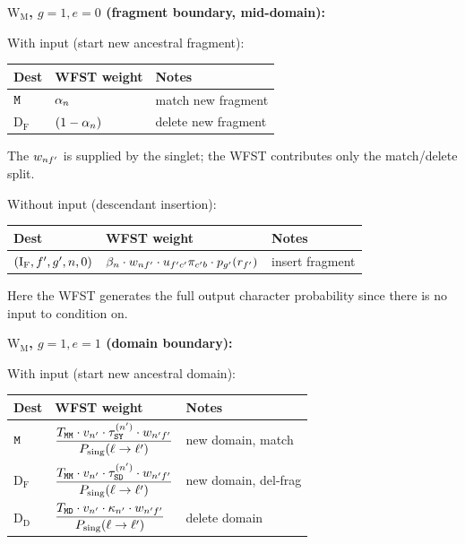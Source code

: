 \bigskip
\noindent\textbf{$\mathrm{W_M}$, $g=1, e=0$ (fragment boundary, mid-domain):}

With input (start new ancestral fragment):
\begin{center}
\renewcommand{\arraystretch}{1.4}
\begin{tabular}{lll}
\hline
Dest & WFST weight & Notes \\
\hline
${\tt M}$ & $\alpha_n$ & match new fragment \\
$\mathrm{D_F}$ & $(1-\alpha_n)$ & delete new fragment \\
\hline
\end{tabular}
\end{center}
The $w_{nf'}$ is supplied by the singlet; the WFST contributes
only the match/delete split.

Without input (descendant insertion):
\begin{center}
\renewcommand{\arraystretch}{1.4}
\begin{tabular}{lll}
\hline
Dest & WFST weight & Notes \\
\hline
$(\mathrm{I_F}, f', g', n, 0)$ &
  $\beta_n \cdot w_{nf'} \cdot u_{f'c'} \pi_{c'b} \cdot p_{g'}(r_{f'})$ &
  insert fragment \\
\hline
\end{tabular}
\end{center}
Here the WFST generates the full output character probability since
there is no input to condition on.

\bigskip
\noindent\textbf{$\mathrm{W_M}$, $g=1, e=1$ (domain boundary):}

With input (start new ancestral domain):
\begin{center}
\renewcommand{\arraystretch}{1.4}
\begin{tabular}{lll}
\hline
Dest & WFST weight & Notes \\
\hline
${\tt M}$ &
  $\dfrac{T_{{\tt M}{\tt M}} \cdot v_{n'} \cdot
   \tau^{(n')}_{{\tt S}{\tt Y}} \cdot w_{n'f'}}
  {P_{\rm sing}(\ell \to \ell')}$ &
  new domain, match \\[8pt]
$\mathrm{D_F}$ &
  $\dfrac{T_{{\tt M}{\tt M}} \cdot v_{n'} \cdot
   \tau^{(n')}_{{\tt S}{\tt D}} \cdot w_{n'f'}}
  {P_{\rm sing}(\ell \to \ell')}$ &
  new domain, del-frag \\[8pt]
$\mathrm{D_D}$ &
  $\dfrac{T_{{\tt M}{\tt D}} \cdot v_{n'} \cdot
   \kappa_{n'} \cdot w_{n'f'}}
  {P_{\rm sing}(\ell \to \ell')}$ &
  delete domain \\
\hline
\end{tabular}
\end{center}

